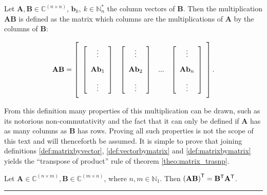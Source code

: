 \begin{definition}\label{def:matrixbymatrix}  Let $\mathbf{A,B}\in\mathbb{C}^{(n\times n)}$, $\mathbf{b}_k,\ k\in\mathbb{N}^*_n$ the column vectors of $\mathbf{B}$. Then the multiplication $\mathbf{AB}$ is defined as the matrix which columns are the multiplications of $\mathbf{A}$ by the columns of $\mathbf{B}$:

\begin{equation} \mathbf{AB} = \left[\raisebox{15mm}{} \begin{array}{cccc} \left[\begin{array}{c} \vdots \\[3mm] \mathbf{A}\mathbf{b}_1 \\[3mm] \vdots \end{array}\right] & \left[\begin{array}{c} \vdots \\[3mm] \mathbf{A}\mathbf{b}_2 \\[3mm] \vdots \end{array}\right] & ... & \left[\begin{array}{c} \vdots \\[3mm] \mathbf{A}\mathbf{b}_n \\[3mm] \vdots \end{array}\right]\end{array}\right] .\end{equation}

\end{definition}

	From this definition many properties of this multiplication can be drawn, such as its notorious non-commutativity and the fact that it can only be defined if $\mathbf{A}$ has as many columns as $\mathbf{B}$ has rows. Proving all such properties is not the scope of this text and will thenceforth be assumed. It is simple to prove that joining definitions \ref{def:matrixbyvector}, \ref{def:vectorbymatrix} and \ref{def:matrixbymatrix} yields the ``transpose of product'' rule of theorem \ref{theo:matrix_trasnp}.

\begin{theorem}\label{theo:matrix_trasnp} Let $\mathbf{A}\in\mathbb{C}^{(n\times m)},\mathbf{B}\in\mathbb{C}^{(m\times n)}$, where $n,m\in\mathbb{N}_1$. Then $\left(\mathbf{AB}\right)^{\mathsf{T}} = \mathbf{B}^{\mathsf{T}}\mathbf{A}^{\mathsf{T}}$.
\end{theorem}
\hrule
\vspace{3mm}

